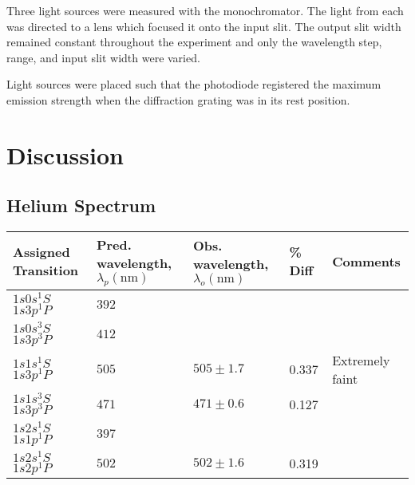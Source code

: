 \documentclass[10pt, twocolumn]{article}
\theoremstyle{definition}
\begin{document}
Three light sources were measured with the monochromator. The light from each was directed to a lens which focused it onto
the input slit. The output slit width remained constant throughout the experiment and only the wavelength step, range, and input
slit width were varied.

Light sources were placed such that the photodiode registered the maximum emission strength when the diffraction grating was in its rest position.
\newpage
\section{Discussion}
\subsection{Helium Spectrum}
\begin{table}[h]
  \centering%
  \begin{tabular}{p{}p{}p{}p{}p{}}
    \toprule
    Assigned Transition         & Pred. wavelength, $\lambda_p (\unit{\nano\meter})$ & Obs. wavelength, $\lambda_o (\unit{\nano\meter})$ & \% Diff & Comments        \\
    \midrule
    $1s0s{}^1\!S$ $1s3p{}^1\!P$ & $392$                                              &                                                   &         &                 \\
    \hline
    $1s0s{}^3\!S$ $1s3p{}^3\!P$ & $412$                                              &                                                   &         &                 \\
    \hline
    $1s1s{}^1\!S$ $1s3p{}^1\!P$ & $505$                                              & $505\pm1.7$                                       & 0.337   & Extremely faint \\
    \hline
    $1s1s{}^3\!S$ $1s3p{}^3\!P$ & $471$                                              & $471\pm0.6$                                       & 0.127   &                 \\
    \hline
    $1s2s{}^1\!S$ $1s1p{}^1\!P$ & $397$                                              &                                                   &         &                 \\
    \hline
    $1s2s{}^1\!S$ $1s2p{}^1\!P$ & $502$                                              & $502\pm1.6$                                       & 0.319   &                 \\

\end{tabular}
\end{table}
\end{document}
